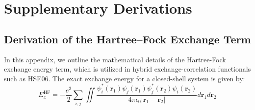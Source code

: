 
%
%

\chapter{Supplementary Derivations}
\label{app:derivations}

\section{Derivation of the Hartree--Fock Exchange Term}
In this appendix, we outline the mathematical details of the Hartree-Fock exchange energy term, which is utilized in hybrid exchange-correlation functionals such as HSE06. The exact exchange energy for a closed-shell system is given by:
\begin{equation}
    E_x^{\text{HF}} = -\frac{e^2}{2} \sum_{i,j} \iint \frac{\psi_i^*(\mathbf{r}_1) \psi_j(\mathbf{r}_1) \psi_j^*(\mathbf{r}_2) \psi_i(\mathbf{r}_2)}{4\pi\epsilon_0 |\mathbf{r}_1 - \mathbf{r}_2|} d\mathbf{r}_1 d\mathbf{r}_2
\end{equation}

